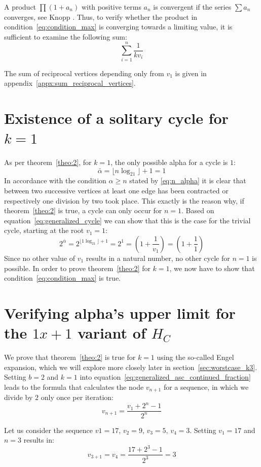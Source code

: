 A product $\prod(1+a_n)$ with positive terms $a_n$ is convergent if the series $\sum a_n$ converges, see Knopp \cite[p.~220]{Ref_Knopp}. Thus, to verify whether the product in condition~\ref{eq:condition_max} is converging towards a limiting value, it is sufficient to examine the following sum:
\begin{equation*}
\sum_{i=1}^{n}\frac{1}{kv_{i}}
\end{equation*}

The sum of reciprocal vertices depending only from $v_1$ is given in appendix~\ref{appx:sum_reciprocal_vertices}.

\section{Existence of a solitary cycle for $k=1$}
As per theorem~\ref{theo:2}, for $k=1$, the only possible alpha for a cycle is $1$:
\[
\bar\alpha=\lfloor n\log_21\rfloor+1=1
\]
In accordance with the condition $\alpha\ge n$ stated by \ref{eq:n_alpha} it is clear that between two successive vertices at least one edge has been contracted or respectively one division by two took place. This exactly is the reason why, if theorem~\ref{theo:2} is true, a cycle can only occur for $n=1$. Based on equation~\ref{eq:generalized_cycle} we can show that this is the case for the trivial cycle, starting at the root $v_1=1$:
\[
2^{\bar\alpha}=2^{\lfloor 1\log_21\rfloor+1}=2^1=\left(1+\frac{1}{v_1}\right)=\left(1+\frac{1}{1}\right)
\]
Since no other value of $v_1$ results in a natural number, no other cycle for $n=1$ is possible. In order to prove theorem~\ref{theo:2} for $k=1$, we now have to show that condition~\ref{eq:condition_max} is true.

\section{Verifying alpha's upper limit for the $1x+1$ variant of $H_C$}
We prove that theorem~\ref{theo:2} is true for $k=1$ using the so-called Engel expansion, which we will explore more closely later in section~\ref{sec:worstcase_k3}. Setting $b=2$ and $k=1$ into equation~\ref{eq:generalized_asc_continued_fraction} leads to the formula that calculates the node $v_{n+1}$ for a sequence, in which we divide by $2$ only once per iteration:
\begin{equation}
\label{eq:appx_1}
v_{n+1}=\frac{v_1+2^n-1}{2^n}
\end{equation}

\begin{example}
	Let us consider the sequence $v1=17$, $v_2=9$, $v_3=5$, $v_4=3$. Setting $v_1=17$ and $n=3$ results in:
	\[
	v_{3+1}=v_4=\frac{17+2^3-1}{2^3}=3
	\]
\end{example}

